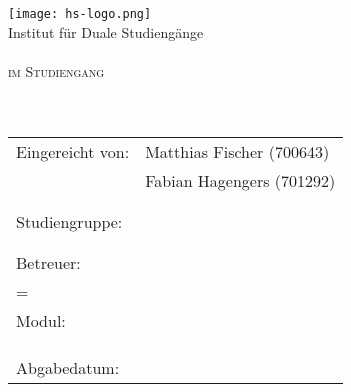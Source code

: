
\begin{titlepage}
	
	\begin{center}
		\texttt{[image: hs-logo.png]}\\
		\large{Institut für Duale Studiengänge}\\[4ex]
		
		\large{\scshape \betreff}\\
		\large{\scshape im Studiengang \studiengang}\\[10ex]
		
		
		\huge{\textbf{\titel}}\\[1.5ex]
		\Large{\textbf{\untertitel}}\\[10ex]
	\end{center}
	
	\begin{tabular} { p{7.5cm} l }
		Eingereicht von: & Matthias Fischer (700643) \\
		& Fabian Hagengers (701292) \\
		\\
		\\
		Studiengruppe: & \autorStudiengruppe \\
		\\\\
		Betreuer: & \betreuer \\
		\if\zweitBetreuer={}\else & \zweitBetreuer \\ \fi
		Modul: & \modul \\
		\\\\\\
		Abgabedatum: & \abgabeTermin \\
	\end{tabular}
	
	
\end{titlepage}